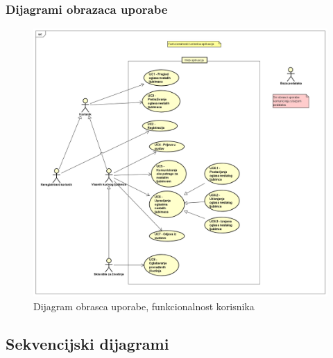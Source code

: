 \pagebreak
\subsubsection{Dijagrami obrazaca uporabe}

\begin{figure}[htb]
	\centering
	\includegraphics[width=\textwidth]{slike/funkcionalnost_korisnika.png}
	\caption{Dijagram obrasca uporabe, funkcionalnost korisnika}
\end{figure}

\pagebreak
\subsection{Sekvencijski dijagrami}

